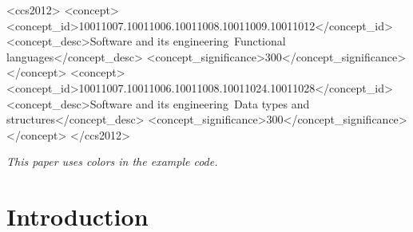 \documentclass[acmsmall, review=false, screen]{acmart}
\begin{document}
\begin{CCSXML}
<ccs2012>
<concept>
<concept_id>10011007.10011006.10011008.10011009.10011012</concept_id>
<concept_desc>Software and its engineering~Functional languages</concept_desc>
<concept_significance>300</concept_significance>
</concept>
<concept>
<concept_id>10011007.10011006.10011008.10011024.10011028</concept_id>
<concept_desc>Software and its engineering~Data types and structures</concept_desc>
<concept_significance>300</concept_significance>
</concept>
</ccs2012>
\end{CCSXML}



\maketitle
\thispagestyle{empty}


\emph{This paper uses colors in the example code.}

\section{Introduction}
\end{document}
